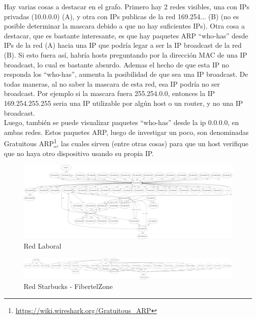 Hay varias cosas a destacar en el grafo. Primero hay 2 redes visibles, una con IPs privadas (10.0.0.0) (A), y otra con IPs publicas de la red 169.254... (B) (no es posible determinar la mascara debido a que no hay suficientes IPs). Otra cosa a destacar, que es bastante interesante, es que hay paquetes ARP ``who-has'' desde IPs de la red (A) hacia una IP que podría legar a ser la IP broadcast de la red (B). Si esto fuera así, habría hosts preguntando por la dirección MAC de una IP broadcast, lo cual es bastante absurdo. Ademas el hecho de que esta IP no responda los ``who-has'', aumenta la posibilidad de que sea una IP broadcast. De todas maneras, al no saber la mascara de esta red, esa IP podría no ser broadcast. Por ejemplo si la mascara fuera 255.254.0.0, entonces la IP 169.254.255.255 seria una IP utilizable por algún host o un router, y no una IP broadcast.\\

Luego, también se puede visualizar paquetes ``who-has'' desde la ip 0.0.0.0, en ambas redes. Estos paquetes ARP, luego de investigar un poco, son denominadas Gratuitous ARP\footnote{\url{https://wiki.wireshark.org/Gratuitous_ARP}}, las cuales sirven (entre otras cosas) para que un host verifique que no haya otro dispositivo usando su propia IP.



\begin{figure}[h!]
  \begin{center}
      \includegraphics[width=270mm,angle=270]{graficos/grafo-baufest.jpg}
	\caption{Red Laboral}
    \label{fig:bf-graph}  
  \end{center}
\end{figure}

\begin{figure}[h!]
  \begin{center}
    \includegraphics[width=270mm,angle=270]{graficos/grafo-starbucks.jpg}
	\caption{Red Starbucks - FibertelZone}
    \label{fig:satrbucks-graph}  
  \end{center}
\end{figure}

